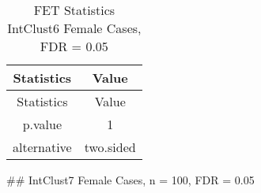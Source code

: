 \documentclass[]{article}
\begin{document}
\begin{longtable}[]{@{}cc@{}}
\caption{FET Statistics IntClust6 Female Cases, FDR =
0.05}\tabularnewline
\toprule
\begin{minipage}[b]{0.18\columnwidth}\centering\strut
Statistics\strut
\end{minipage} & \begin{minipage}[b]{0.14\columnwidth}\centering\strut
Value\strut
\end{minipage}\tabularnewline
\midrule
\endfirsthead
\toprule
\begin{minipage}[b]{0.18\columnwidth}\centering\strut
Statistics\strut
\end{minipage} & \begin{minipage}[b]{0.14\columnwidth}\centering\strut
Value\strut
\end{minipage}\tabularnewline
\midrule
\endhead
\begin{minipage}[t]{0.18\columnwidth}\centering\strut
p.value\strut
\end{minipage} & \begin{minipage}[t]{0.14\columnwidth}\centering\strut
1\strut
\end{minipage}\tabularnewline
\begin{minipage}[t]{0.18\columnwidth}\centering\strut
alternative\strut
\end{minipage} & \begin{minipage}[t]{0.14\columnwidth}\centering\strut
two.sided\strut
\end{minipage}\tabularnewline
\bottomrule
\end{longtable}

\pagebreak
\#\# IntClust7 Female Cases, n = 100, FDR = 0.05
\end{document}
